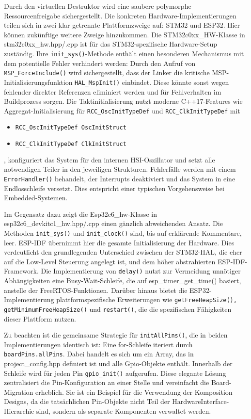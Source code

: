 Durch den virtuellen Destruktor wird eine saubere polymorphe Ressourcenfreigabe sichergestellt.
Die konkreten Hardware-Implementierungen teilen sich in zwei klar getrennte Plattformzweige auf: STM32 und ESP32. 
Hier können zukünftige weitere Zweige hinzukommen.
Die STM32c0xx\_HW-Klasse in stm32c0xx\_hw.hpp/.cpp ist für das STM32-spezifische Hardware-Setup zuständig.
Ihre \texttt{init\_sys()}-Methode enthält einen besonderen Mechanismus mit dem potentielle Fehler verhindert werden:
Durch den Aufruf von \texttt{MSP\_ForceInclude()} wird sichergestellt, dass der Linker die kritische MSP-Initialisierungsfunktion \texttt{HAL\_MspInit()} einbindet. 
Diese könnte sonst wegen fehlender direkter Referenzen eliminiert werden und für Fehlverhalten im Buildprozess sorgen.
Die Taktinitialisierung nutzt moderne C++17-Features wie Aggregat-Initialisierung für \texttt{RCC\_OscInitTypeDef} und \texttt{RCC\_ClkInitTypeDef} mit 

\begin{itemize}
	\item \texttt{RCC\_OscInitTypeDef OscInitStruct{}}
	\item \texttt{RCC\_ClkInitTypeDef ClkInitStruct{}}
\end{itemize}

, konfiguriert das System für den internen HSI-Oszillator und setzt alle notwendigen Teiler in den jeweiligen Strukturen.
Fehlerfälle werden mit einem \texttt{ErrorHandler()} behandelt, der Interrupts deaktiviert und das System in eine Endlosschleife versetzt.
Dies entspricht einer typischen Vorgehensweise bei Embedded-Systemen.

Im Gegensatz dazu zeigt die Esp32c6\_hw-Klasse in esp32c6\_devkitc1\_hw.hpp/.cpp einen gänzlich abweichenden Ansatz.
Die Methoden \texttt{init\_sys()} und \texttt{init\_clock()} sind, bis auf erklärende Kommentare, leer.
ESP-IDF übernimmt hier die gesamte Initialisierung der Hardware.
Dies verdeutlicht den grundlegenden Unterschied zwischen der STM32-HAL, die eher auf die Low-Level Steuerung angelegt ist, und dem höher abstrahierten ESP-IDF-Framework.
Die Implementierung von \texttt{delay()} nutzt zur Vermeidung unnötiger Abhängigkeiten eine Busy-Wait-Schleife, die auf esp\_timer\_get\_time() basiert, anstelle der FreeRTOS-Funktionen.
Darüber hinaus bietet die ESP32-Implementierung plattformspezifische Erweiterungen wie \texttt{getFreeHeapSize(), getMinimumFreeHeapSize()} und \texttt{restart()}, die die spezifischen Fähigkeiten dieser Plattform nutzen.

Zu beachten ist die gemeinsame Strategie für \texttt{initAllPins()}, die in beiden Implementierungen identisch ist: 
Eine for-Schleife iteriert durch \texttt{boardPins.allPins}.
Dabei handelt es sich um ein Array, das in project\_config.hpp definiert ist und alle Gpio-Objekte enthält.
Innerhalb der Schleife wird für jeden Pin \texttt{gpio\_init()} aufgerufen.
Diese elegante Lösung zentralisiert die Pin-Konfiguration an einer Stelle und vereinfacht die Board-Migration erheblich. 
Sie ist ein Beispiel für die Verwendung der Komposition Designs, da die tatsächlichen Pin-Objekte nicht Teil der HardwareInterface-Hierarchie sind, sondern als separate Komponenten verwaltet werden.

